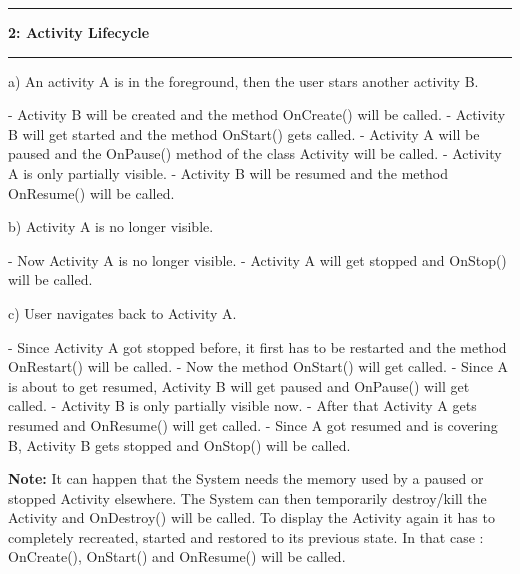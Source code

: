 \documentclass[11pt]{article}
\newcommand\question[2]{\vspace{.25in}\hrule\textbf{#1: #2}\vspace{.5em}\hrule\vspace{.10in}}
\begin{document}
\raggedright

\newcommand\NAME{Lukas, Young, Vincent}  %

\question{2}{Activity Lifecycle} 
 a) An activity A is in the foreground, then the user stars another activity B.

 - Activity B will be created and the method OnCreate() will be called. \newline
 - Activity B will get started and the method OnStart() gets called.\newline
 - Activity A will be paused and the OnPause() method of the class Activity will be called.\newline
 - Activity A is only partially visible.\newline
 - Activity B will be resumed and the method OnResume() will be called.\newline

b) Activity A is no longer visible.

- Now Activity A is no longer visible.
- Activity A will get stopped and OnStop() will be called.

c) User navigates back to Activity A.

- Since Activity A got stopped before, it first has to be restarted and the method OnRestart() will be called.\newline
- Now the method OnStart() will get called.\newline
- Since A is about to get resumed, Activity B will get paused and OnPause() will get called.\newline
- Activity B is only partially visible now.\newline
- After that Activity A gets resumed and OnResume() will get called.\newline
- Since A got resumed and is covering B, Activity B gets stopped and OnStop() will be called.\newline

\textbf{Note:} It can happen that the System needs the memory used by a paused or stopped Activity elsewhere.\newline
	The System can then temporarily destroy/kill the Activity and OnDestroy() will be called. \newline
	To display the Activity again it has to completely recreated, started and restored to its previous state. \newline
	In that case : OnCreate(), OnStart() and OnResume() will be called. \newline
\end{document}

